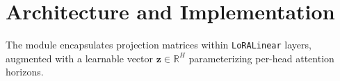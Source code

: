 \section{Architecture and Implementation}
The module encapsulates projection matrices within \texttt{LoRALinear} layers, augmented with a learnable vector $\mathbf{z} \in \mathbb{R}^H$ parameterizing per-head attention horizons.
